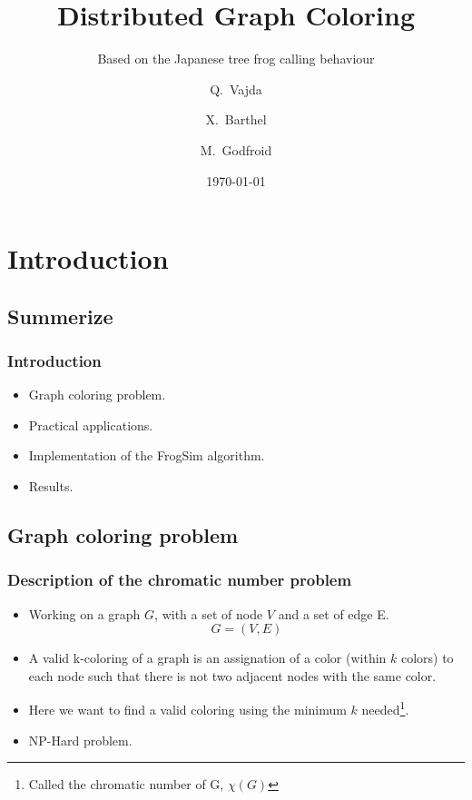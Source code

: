 \documentclass{beamer}
\title{Distributed Graph Coloring}
\subtitle{Based on the Japanese tree frog calling behaviour}
\author[Vajda, Barthel, Godfroid] %
{Q.~Vajda \and X.~Barthel \and M.~Godfroid}
\date{\today}
\begin{document}
\frame{\titlepage}

\section{Introduction}

\subsection{Summerize}

\begin{frame} 
\frametitle{Introduction}
  \begin{itemize}
    \item	Graph coloring problem.
    \item	Practical applications.
    \item	Implementation of the FrogSim algorithm.
    \item	Results.
  \end{itemize}
\end{frame}


\subsection{Graph coloring problem}

\begin{frame} 
\frametitle{Description of the chromatic number problem}
\begin{itemize}
	\item Working on a graph $G$, with a set of node $V$ and a set of edge E.
	\begin{equation*}
	G = (V,E)
	\end{equation*}
	\item A valid k-coloring of a graph is an assignation of a color (within $k$ colors) to each node such that there is not two adjacent nodes with the same color.
	\item Here we want to find a valid coloring using the minimum $k$ needed\footnote{Called the chromatic number of G, $\chi(G)$}.
	\item NP-Hard problem.
\end{itemize}

\end{frame}

\end{document}
